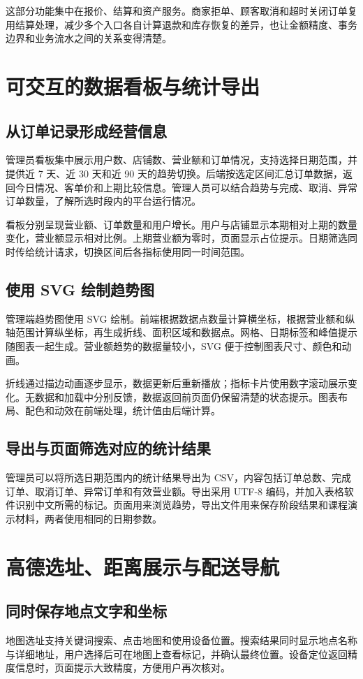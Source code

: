这部分功能集中在报价、结算和资产服务。商家拒单、顾客取消和超时关闭订单复用结算处理，减少多个入口各自计算退款和库存恢复的差异，也让金额精度、事务边界和业务流水之间的关系变得清楚。

\section{可交互的数据看板与统计导出}
\subsection{从订单记录形成经营信息}
管理员看板集中展示用户数、店铺数、营业额和订单情况，支持选择日期范围，并提供近 7 天、近 30 天和近 90 天的趋势切换。后端按选定区间汇总订单数据，返回今日情况、客单价和上期比较信息。管理人员可以结合趋势与完成、取消、异常订单数量，了解所选时段内的平台运行情况。

看板分别呈现营业额、订单数量和用户增长。用户与店铺显示本期相对上期的数量变化，营业额显示相对比例。上期营业额为零时，页面显示占位提示。日期筛选同时传给统计请求，切换区间后各指标使用同一时间范围。

\subsection{使用 SVG 绘制趋势图}
管理端趋势图使用 SVG 绘制。前端根据数据点数量计算横坐标，根据营业额和纵轴范围计算纵坐标，再生成折线、面积区域和数据点。网格、日期标签和峰值提示随图表一起生成。营业额趋势的数据量较小，SVG 便于控制图表尺寸、颜色和动画。

折线通过描边动画逐步显示，数据更新后重新播放；指标卡片使用数字滚动展示变化。无数据和加载中分别反馈，数据返回前页面仍保留清楚的状态提示。图表布局、配色和动效在前端处理，统计值由后端计算。

\subsection{导出与页面筛选对应的统计结果}
管理员可以将所选日期范围内的统计结果导出为 CSV，内容包括订单总数、完成订单、取消订单、异常订单和有效营业额。导出采用 UTF-8 编码，并加入表格软件识别中文所需的标记。页面用来浏览趋势，导出文件用来保存阶段结果和课程演示材料，两者使用相同的日期参数。

\section{高德选址、距离展示与配送导航}
\subsection{同时保存地点文字和坐标}
地图选址支持关键词搜索、点击地图和使用设备位置。搜索结果同时显示地点名称与详细地址，用户选择后可在地图上查看标记，并确认最终位置。设备定位返回精度信息时，页面提示大致精度，方便用户再次核对。

